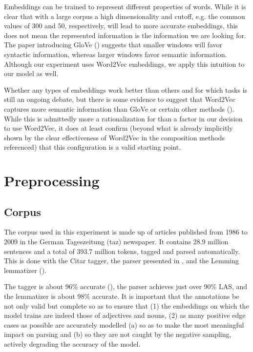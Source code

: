 \documentclass[a4paper, 12pt]{article}
\begin{document}
Embeddings can be trained to represent different properties of words. While it is clear that with a large corpus a high dimensionality and cutoff, e.g. the common values of 300 and 50, respectively, will lead to more accurate embeddings, this does not mean the represented information is the information we are looking for. The paper introducing GloVe (\cite{PenningtonSocherManningGlove}) suggests that smaller windows will favor syntactic information, whereas larger windows favor semantic information. Although our experiment uses Word2Vec embeddings, we apply this intuition to our model as well.

Whether any types of embeddings work better than others and for which tasks is still an ongoing debate, but there is some evidence to suggest that Word2Vec captures more semantic information than GloVe or certain other methods (\cite{SchnabelEmbeddings}). While this is admittedly more a rationalization for than a factor in our decision to use Word2Vec, it does at least confirm (beyond what is already implicitly shown by the clear effectiveness of Word2Vec in the composition methods referenced) that this configuration is a valid starting point.


\section{Preprocessing}

\subsection{Corpus}

The corpus used in this experiment is made up of articles published from 1986 to 2009 in the German Tageszeitung (taz) newspaper. It contains 28.9 million sentences and a total of 393.7 million tokens, tagged and parsed automatically. This is done with the Citar tagger, the parser presented in \cite{deKokParsing}, and the Lemming lemmatizer (\cite{Lemming}).

The tagger is about 96\% accurate (\cite{PlankVanNoord}), the parser achieves just over 90\% LAS, and the lemmatizer is about 98\% accurate. It is important that the annotations be not only valid but complete so as to ensure that (1) the embeddings on which the model trains are indeed those of adjectives and nouns, (2) as many positive edge cases as possible are accurately modelled (a) so as to make the most meaningful impact on parsing and (b) so they are not caught by the negative sampling, actively degrading the accuracy of the model.
\end{document}
